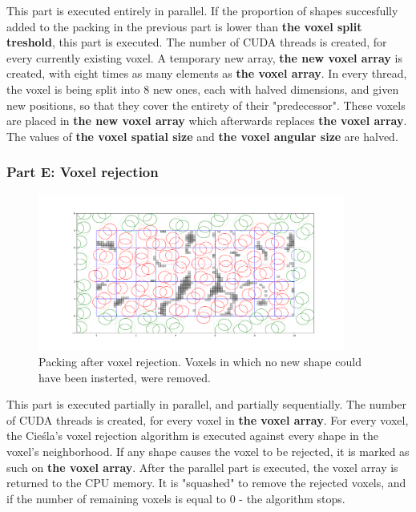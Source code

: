\documentclass[12pt, oneside]{report}
\begin{document}
This part is executed entirely in parallel. \newline
If the proportion of shapes succesfully added to the packing in the previous part is lower than \textbf{the voxel split treshold}, this part is executed. \newline
The number of CUDA threads is created, for every currently existing voxel. A temporary new array, \textbf{the new voxel array} is created, with eight times as many elements as \textbf{the voxel array}. In every thread, the voxel is being split into 8 new ones, each with halved dimensions, and given new positions, so that they cover the entirety of their "predecessor". These voxels are placed in \textbf{the new voxel array} which afterwards replaces \textbf{the voxel array}.
The values of \textbf{the voxel spatial size} and \textbf{the voxel angular size} are halved.

\subsubsection{Part E: Voxel rejection}

\begin{figure}[H]
  \centering
	\includegraphics[width=0.9\textwidth,keepaspectratio]{Images/GPURSA/Figure_6.pdf}
	\caption{Packing after voxel rejection. Voxels in which no new shape could have been insterted, were removed.}
	\label{GPURSA_Process_5}
\end{figure}

This part is executed partially in parallel, and partially sequentially. \newline
The number of CUDA threads is created, for every voxel in \textbf{the voxel array}. For every voxel, the Cieśla's voxel rejection algorithm is executed against every shape in the voxel's neighborhood. If any shape causes the voxel to be rejected, it is marked as such on \textbf{the voxel array}. \newline
After the parallel part is executed, the voxel array is returned to the CPU memory. It is "squashed" to remove the rejected voxels, and if the number of remaining voxels is equal to 0 - the algorithm stops.
\end{document}
